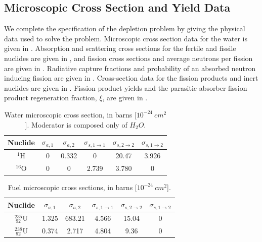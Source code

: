 \subsection{Microscopic Cross Section and Yield Data}

We complete the specification of the depletion problem  by giving the physical data used to solve the problem.  
Microscopic cross section data for the water is given in .  
Absorption and scattering cross sections for the fertile and fissile nuclides are given in ,  
and fission cross sections and average neutrons per fission are given in .  
Radiative capture fractions and probability of an absorbed neutron inducing fission are given in .   
Cross-section data for the fission products and inert nuclides are given in .
Fission product yields and the parasitic absorber fission product regeneration fraction, $\xi$, are given in .
\begin{table}[!htp]
\centering
\caption{Water microscopic cross section, in barns [$10^{-24}~cm^2$].  Moderator is composed only of $H_{2} O$.}
\begin{tabular}{|c|c|c|c|c|c|}
\hline
Nuclide &		$\sigma_{a,1}$ & $\sigma_{a,2} $& $\sigma_{s,1\to1} $& $\sigma_{s,2\to2}$ & $\sigma_{s,1\to2}$ \\
\hline
$^1\text{H}$   & 0  &  0.332 & 0 & 20.47 & 3.926 \\
\hline
$^{16}\text{O}$&  0 & 0 &  2.739 & 3.780 & 0 \\
\hline
\end{tabular}	
\label{tbl:water}
\end{table}
%
%
\begin{table}[!htp]
\centering
\caption{Fuel microscopic cross sections, in barns [$10^{-24}~cm^2$].}
\begin{tabular}{|c|c|c|c|c|c|}
\hline
Nuclide &		$\sigma_{a,1}$ & $\sigma_{a,2} $& $\sigma_{s,1\to1} $& $\sigma_{s,2\to2}$ & $\sigma_{s,1\to2}$ \\
\hline
$^{235} _{~92} \text{U}$   & 1.325 &  683.21 & 4.566 & 15.04 & 0\\
\hline
$^{238} _{~92} \text{U}$   & 0.374 &  2.717 & 4.804 & 9.36 & 0 \\
\hline
\end{tabular}	
\label{tbl:fresh-fuel}
\end{table}
